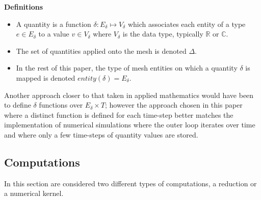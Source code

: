 \noindent \textbf{Definitions}
\begin{itemize}
\item A quantity is a function $\delta: E_{\delta} \mapsto V_{\delta}$ which associates each entity of a type $e\in E_{\delta}$ to a value $v\in V_{\delta}$ where $V_{\delta}$ is the data type, typically $\mathbb{R}$ or $\mathbb{C}$.
\item The set of quantities applied onto the mesh is denoted $\Delta$.
\item In the rest of this paper, the type of mesh entities on which a quantity $\delta$ is mapped is denoted $entity(\delta)=E_{\delta}$.
\end{itemize}

Another approach closer to that taken in applied mathematics would have been to define $\delta$ functions over $E_{\delta} \times T$; however the approach chosen in this paper where a distinct function is defined for each time-step better matches the implementation of numerical simulations where the outer loop iterates over time and where only a few time-steps of quantity values are stored.

\subsection{Computations}

In this section are considered two different types of computations, a reduction or a numerical kernel. 

